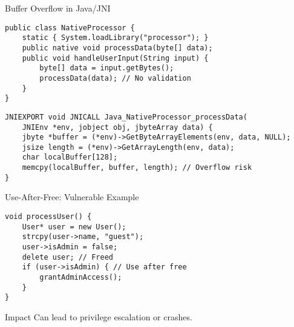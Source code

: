 \documentclass[12pt]{beamer}
\begin{document}
\begin{frame}[fragile]{Buffer Overflow in Java/JNI}
  \begin{lstlisting}[style=javastyle]
public class NativeProcessor {
    static { System.loadLibrary("processor"); }
    public native void processData(byte[] data);
    public void handleUserInput(String input) {
        byte[] data = input.getBytes();
        processData(data); // No validation
    }
}
  \end{lstlisting}
  \begin{lstlisting}[style=cppstyle]
JNIEXPORT void JNICALL Java_NativeProcessor_processData(
    JNIEnv *env, jobject obj, jbyteArray data) {
    jbyte *buffer = (*env)->GetByteArrayElements(env, data, NULL);
    jsize length = (*env)->GetArrayLength(env, data);
    char localBuffer[128];
    memcpy(localBuffer, buffer, length); // Overflow risk
}
  \end{lstlisting}
\end{frame}

\begin{frame}[fragile]{Use-After-Free: Vulnerable Example}
  \begin{lstlisting}[style=cppstyle]
void processUser() {
    User* user = new User();
    strcpy(user->name, "guest");
    user->isAdmin = false;
    delete user; // Freed
    if (user->isAdmin) { // Use after free
        grantAdminAccess();
    }
}
  \end{lstlisting}
  \begin{alertblock}{Impact}
    Can lead to privilege escalation or crashes.
  \end{alertblock}
\end{frame}
\end{document}

